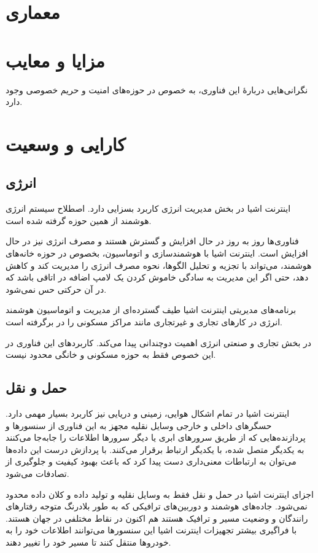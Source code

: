 \documentclass[a4paper, margin=1in]{article}
\begin{document}
\section{معماری}

\section{مزایا و معایب}

نگرانی‌هایی دربارهٔ این فناوری، به خصوص در حوزه‌های امنیت و حریم خصوصی وجود دارد.\cite{wp:iot}

\section{کارایی و وسعیت}
\subsection{انرژی}
اینترنت اشیا در بخش مدیریت انرژی کاربرد بسزایی دارد.
اصطلاح سیستم انرژی هوشمند از همین حوزه گرفته شده است.


فناوری‌ها روز به روز در حال افزایش و گسترش هستند و مصرف انرژی نیز در حال افزایش است. اینترنت اشیا با هوشمندسازی و اتوماسیون، بخصوص در حوزه خانه‌های هوشمند،
می‌تواند با تجزیه و تحلیل الگوها، نحوه مصرف انرژی را مدیریت کند و کاهش دهد، حتی اگر این مدیریت به سادگی خاموش کردن یک لامپ اضافه در اتاقی باشد که در آن حرکتی حس نمی‌شود.

برنامه‌های مدیریتی اینترنت اشیا طیف گسترده‌ای از مدیریت و اتوماسیون هوشمند انرژی در کارهای تجاری و غیرتجاری مانند مراکز مسکونی را در برگرفته است.

در بخش تجاری و صنعتی انرژی اهمیت دوچندانی پیدا می‌کند.
کاربردهای این فناوری در این خصوص فقط به حوزه مسکونی و خانگی محدود نیست.

\subsection{حمل و نقل}
اینترنت اشیا در تمام اشکال هوایی، زمینی و دریایی نیز کاربرد بسیار مهمی دارد.
حسگرهای داخلی و خارجی وسایل نقلیه مجهز به این فناوری از سنسورها و پردازنده‌هایی که از طریق سرورهای ابری یا دیگر سرورها اطلاعات را جابه‌جا می‌کنند به یکدیگر متصل شده،
با یکدیگر ارتباط برقرار می‌کنند.
با پردازش درست این داده‌ها می‌توان به ارتباطات معنی‌داری دست پیدا کرد که باعث بهبود کیفیت و جلوگیری از تصادفات می‌شود.

اجزای اینترنت اشیا در حمل و نقل فقط به وسایل نقلیه و تولید داده و کلان داده محدود نمی‌شود.
جاده‌های هوشمند و دوربین‌های ترافیکی که به طور بلادرنگ متوجه رفتارهای رانندگان و وضعیت مسیر و ترافیک هستند هم اکنون در نقاط مختلفی در جهان هستند.
با فراگیری بیشتر تجهیزات اینترنت اشیا این سنسورها می‌توانند اطلاعات خود را به خودروها منتقل کنند تا مسیر خود را تغییر دهند.
\end{document}

